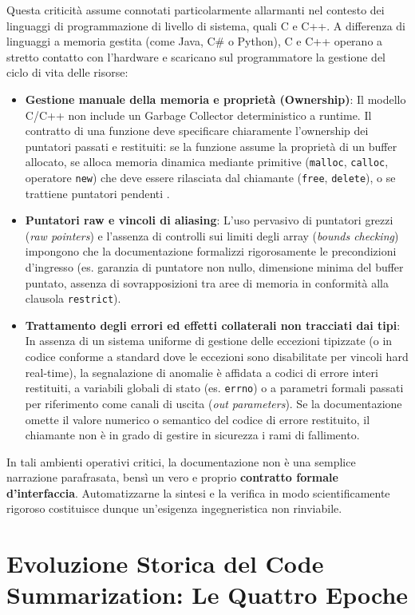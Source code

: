 Questa criticità assume connotati particolarmente allarmanti nel contesto dei linguaggi di programmazione di livello di sistema, quali C e C++. A differenza di linguaggi a memoria gestita (come Java, C\# o Python), C e C++ operano a stretto contatto con l'hardware e scaricano sul programmatore la gestione del ciclo di vita delle risorse:
\begin{itemize}[leftmargin=*, label=\textbullet]
    \item \textbf{Gestione manuale della memoria e proprietà (Ownership)}: Il modello C/C++ non include un Garbage Collector deterministico a runtime. Il contratto di una funzione deve specificare chiaramente l'ownership dei puntatori passati e restituiti: se la funzione assume la proprietà di un buffer allocato, se alloca memoria dinamica mediante primitive (\texttt{malloc}, \texttt{calloc}, operatore \texttt{new}) che deve essere rilasciata dal chiamante (\texttt{free}, \texttt{delete}), o se trattiene puntatori pendenti \cite{lomshakov_proconsul_2024}.
    \item \textbf{Puntatori raw e vincoli di aliasing}: L'uso pervasivo di puntatori grezzi (\emph{raw pointers}) e l'assenza di controlli sui limiti degli array (\emph{bounds checking}) impongono che la documentazione formalizzi rigorosamente le precondizioni d'ingresso (es. garanzia di puntatore non nullo, dimensione minima del buffer puntato, assenza di sovrapposizioni tra aree di memoria in conformità alla clausola \texttt{restrict}).
    \item \textbf{Trattamento degli errori ed effetti collaterali non tracciati dai tipi}: In assenza di un sistema uniforme di gestione delle eccezioni tipizzate (o in codice conforme a standard dove le eccezioni sono disabilitate per vincoli hard real-time), la segnalazione di anomalie è affidata a codici di errore interi restituiti, a variabili globali di stato (es. \texttt{errno}) o a parametri formali passati per riferimento come canali di uscita (\emph{out parameters}). Se la documentazione omette il valore numerico o semantico del codice di errore restituito, il chiamante non è in grado di gestire in sicurezza i rami di fallimento.
\end{itemize}
In tali ambienti operativi critici, la documentazione non è una semplice narrazione parafrasata, bensì un vero e proprio \textbf{contratto formale d'interfaccia}. Automatizzarne la sintesi e la verifica in modo scientificamente rigoroso costituisce dunque un'esigenza ingegneristica non rinviabile.

\section{Evoluzione Storica del Code Summarization: Le Quattro Epoche}
\label{sec:intro_quattro_epoche}

